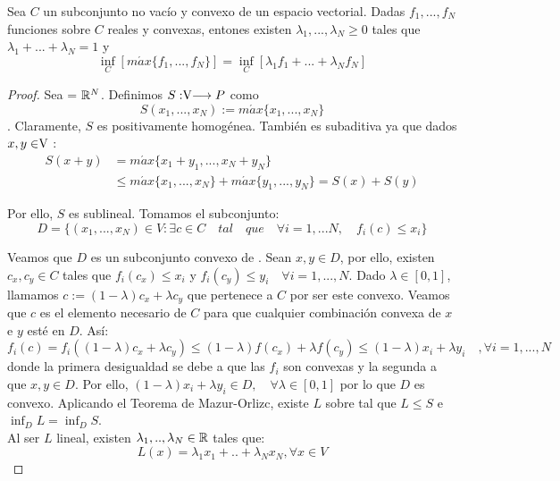 	\begin{lemaBox}
		Sea $ C $ un subconjunto no vacío y convexo de un espacio vectorial. Dadas $ f_1, ..., f_N $  funciones sobre $ C $ reales y convexas, entones existen $ \lambda_1, ..., \lambda_N \geq 0$ tales que $ \lambda_1+ ...+ \lambda_N = 1$ y
		\[
		\inf_C\left[ m\acute{a}x \{f_1, ..., f_N\}\right] = \inf_C \left[ \lambda_1 f_1+ ...+\lambda_N f_N \right]
		\] 
	\end{lemaBox}
	\begin{proof}
		Sea  \vecSpace = $ \mathbb{R}^N $. Definimos $S:\vecSpace \longrightarrow P $ como \[ S(x_1, ..., x_N) := m\acute{a}x \{x_1, ..., x_N\} \]. Claramente, $ S $ es positivamente homogénea. También es subaditiva ya que dados $ x,y \in \vecSpace $ : 
		\begin{equation*}
		\begin{split}
		S(x+y) &= m\acute{a}x \{x_1 + y_1, ..., x_N +y_N \}\\ 
		&\leq m\acute{a}x \{x_1, ..., x_N\} + m\acute{a}x \{y_1, ...,y_N\} = S(x) + S(y)
		\end{split}
		\end{equation*}
		
		Por ello, $ S $ es sublineal. Tomamos el subconjunto:
		\[ 
		D = \{ (x_1, ..., x_N)\in V: \exists c \in C \quad tal \quad que \quad \forall i = 1,...N,\quad f_i(c) \leq x_i \}
		\]
		
		Veamos que $ D $ es un subconjunto convexo de \vecSpace. Sean $ x, y \in D $, por ello, existen $ c_x, c_y \in C $ tales que $ f_i (c_x) \leq x_i  $ y $ f_i (c_y) \leq y_i \quad \forall i=1,...,N $. Dado $ \lambda \in [0,1] $, llamamos $ c := (1-\lambda)c_x + \lambda c_y $ que pertenece a $ C $ por ser este convexo. Veamos que $ c $ es el elemento necesario de $ C $ para que cualquier combinación convexa de $ x $ e $ y $ esté en $ D $. Así:	
		\[
		f_i(c) = f_i((1-\lambda)c_x + \lambda c_y) \leq (1-\lambda)f(c_x) + \lambda f(c_y) \leq (1-\lambda)x_i + \lambda y_i \quad , \forall i =1,...,N 
		\]
		donde la primera desigualdad se debe a que las $ f_i $ son convexas y la segunda a que $ x,y \in D $. Por ello, $ (1-\lambda)x_i + \lambda y_i \in D , \quad \forall \lambda \in [0,1] $ por lo que $ D $ es convexo. Aplicando el Teorema de Mazur-Orlizc, existe $ L $ sobre \vecSpace tal que $ L \leq S $ e $ \inf_D L = \inf_D S $. \\
		
		Al ser $ L $ lineal, existen $ \lambda_1, .., \lambda_N \in \mathbb{R}$ tales que: 
		\[
		L(x) =  \lambda_1 x_1 + ..+ \lambda_N x_N , \forall x \in V \] 
		

\end{proof}
